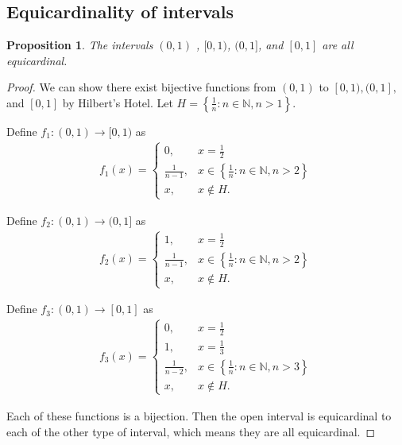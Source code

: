 \documentclass{article}[12pt]
\newtheorem*{proposition*}{Proposition}
\newcommand{\N}{\mathbb{N}}
\begin{document}
    \subsection{Equicardinality of intervals}\label{app:interval-cardinalities}
    
        \begin{proposition*}
            The intervals $(0, 1)$ , $[0, 1)$, $(0, 1]$, and $[0, 1]$ are all equicardinal.
        \end{proposition*}
    
    
        \begin{proof}
            We can show there exist bijective functions from $(0, 1)$ to $[0, 1), (0, 1],$ and $[0, 1]$ by Hilbert's Hotel. Let $H = \left\{\frac{1}{n} : n \in \N, n > 1 \right\}$.
            
            Define $f_1 : (0, 1) \to [0, 1)$ as
            \begin{align}
                f_1(x) = \begin{cases}
                    0,              & x = \frac{1}{2}
                    \\
                    \frac{1}{n-1},  & x \in \left\{\frac{1}{n} : n \in \N, n > 2\right\}
                    \\
                    x,              & x \not\in H.
                \end{cases}
            \end{align}
            
            Define $f_2 : (0, 1) \to (0, 1]$ as
            \begin{align}
                f_2(x) = \begin{cases}
                    1,              & x = \frac{1}{2}
                    \\
                    \frac{1}{n-1},  & x \in \left\{\frac{1}{n} : n \in \N, n > 2\right\}
                    \\
                    x,              & x \not\in H.
                \end{cases}
            \end{align}
            
            Define $f_3 : (0, 1) \to [0, 1]$ as
            \begin{align}
                f_3(x) = \begin{cases}
                    0,              & x = \frac{1}{2}
                    \\
                    1,              & x = \frac{1}{3}
                    \\
                    \frac{1}{n-2},  & x \in \left\{\frac{1}{n} : n \in \N, n > 3\right\}
                    \\
                    x,              & x \not\in H.
                \end{cases}
            \end{align}
                
            Each of these functions is a bijection. Then the open interval is equicardinal to each of the other type of interval, which means they are all equicardinal.
        \end{proof}
        
\end{document}
